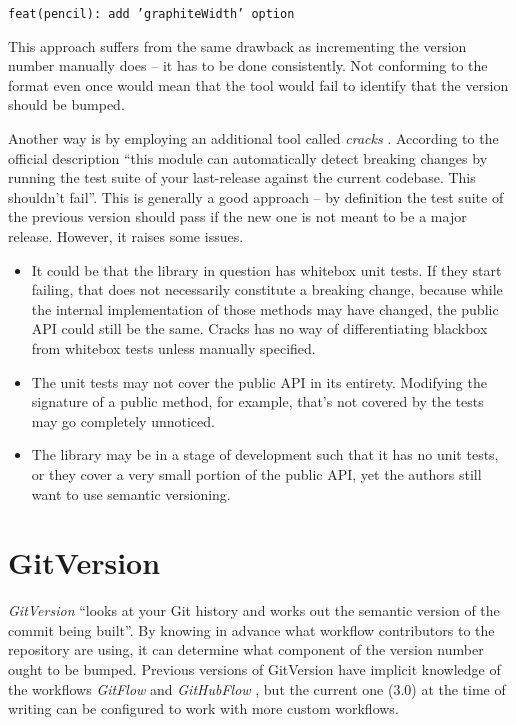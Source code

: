 \documentclass{l4proj}
\begin{document}
\begin{center}
\texttt{feat(pencil): add 'graphiteWidth' option}
\end{center}

This approach suffers from the same drawback as incrementing the
version number manually does -- it has to be done consistently.
Not conforming to the format even once would mean that the tool would
fail to identify that the version should be bumped.

Another way is by employing an additional tool called
\textit{cracks} \cite{Cracks}. According to the official description
``this module can automatically detect breaking changes by running the
test suite of your last-release against the current codebase. This
shouldn't fail''. This is generally a good approach -- by definition
the test suite of the previous version should pass if the new one is
not meant to be a major release. However, it raises some issues.

\begin{itemize}
\item It could be that the library in question has whitebox unit
tests. If they start failing, that does not necessarily constitute a
breaking change, because while the internal implementation of those
methods may have changed, the public API could still be the same. Cracks has
no way of differentiating blackbox from whitebox tests unless manually
specified.
\item The unit tests may not cover the public API in its entirety.
Modifying the signature of a public method, for example, that's not
covered by the tests may go completely unnoticed.
\item The library may be in a stage of development such that it has no
unit tests, or they cover a very small portion of the public API, yet
the authors still want to use semantic versioning.
\end{itemize}

\section{GitVersion}

\textit{GitVersion} \cite{GitVersion} ``looks at your Git history and
works out the semantic version of the commit being built''.  By
knowing in advance what workflow contributors to the repository are
using, it can determine what component of the version number ought to
be bumped.
Previous versions of GitVersion have implicit knowledge of
the workflows \textit{GitFlow} \cite{GitFlow} and
\textit{GitHubFlow} \cite{GitHubFlow}, but the current one (3.0) at the
time of writing can be configured to work with more custom workflows.
\end{document}

